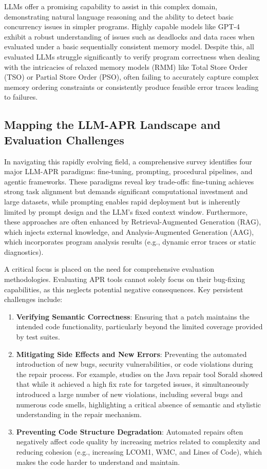 LLMs offer a promising capability to assist in this complex domain, demonstrating natural language reasoning and the ability to detect basic concurrency issues in simpler programs. Highly capable models like GPT-4 exhibit a robust understanding of issues such as deadlocks and data races when evaluated under a basic sequentially consistent memory model. Despite this, all evaluated LLMs struggle significantly to verify program correctness when dealing with the intricacies of relaxed memory models (RMM) like Total Store Order (TSO) or Partial Store Order (PSO), often failing to accurately capture complex memory ordering constraints or consistently produce feasible error traces leading to failures.

\subsection{Mapping the LLM-APR Landscape and Evaluation Challenges}

In navigating this rapidly evolving field, a comprehensive survey identifies four major LLM-APR paradigms: fine-tuning, prompting, procedural pipelines, and agentic frameworks. These paradigms reveal key trade-offs: fine-tuning achieves strong task alignment but demands significant computational investment and large datasets, while prompting enables rapid deployment but is inherently limited by prompt design and the LLM's fixed context window. Furthermore, these approaches are often enhanced by Retrieval-Augmented Generation (RAG), which injects external knowledge, and Analysis-Augmented Generation (AAG), which incorporates program analysis results (e.g., dynamic error traces or static diagnostics).

A critical focus is placed on the need for comprehensive evaluation methodologies. Evaluating APR tools cannot solely focus on their bug-fixing capabilities, as this neglects potential negative consequences. Key persistent challenges include:

\begin{enumerate}
    \item \textbf{Verifying Semantic Correctness}: Ensuring that a patch maintains the intended code functionality, particularly beyond the limited coverage provided by test suites.
    \item \textbf{Mitigating Side Effects and New Errors}: Preventing the automated introduction of new bugs, security vulnerabilities, or code violations during the repair process. For example, studies on the Java repair tool Sorald showed that while it achieved a high fix rate for targeted issues, it simultaneously introduced a large number of new violations, including several bugs and numerous code smells, highlighting a critical absence of semantic and stylistic understanding in the repair mechanism.
    \item \textbf{Preventing Code Structure Degradation}: Automated repairs often negatively affect code quality by increasing metrics related to complexity and reducing cohesion (e.g., increasing LCOM1, WMC, and Lines of Code), which makes the code harder to understand and maintain.
\end{enumerate}

